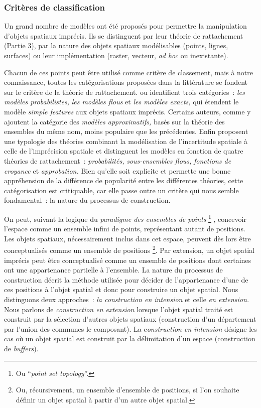 \subsubsection{Critères de classification}

Un grand nombre de modèles ont été proposés pour permettre la
manipulation d’objets spatiaux imprécis. Ils se distinguent par leur
théorie de rattachement (Partie 3), par la nature des objets spatiaux
modélisables (\eg points, lignes, surfaces) ou leur implémentation
(\eg raster, vecteur, \emph{ad hoc} ou inexistante).

Chacun de ces points peut être utilisé comme critère de classement,
mais à notre connaissance, toutes les catégorisations proposées dans
la littérature se fondent sur le critère de la théorie de
rattachement. \textcite{Clementini2008} ou \textcite{Erwig1997}
identifient trois catégories : \emph{les modèles probabilistes,}
\emph{les modèles flous} et \emph{les modèles exacts,} qui étendent le
modèle \emph{simple features} aux objets spatiaux imprécis. Certains
auteurs, comme \textcite{Schneider2001,Schneider2008,Carniel2016} y
ajoutent la catégorie des \emph{modèles approximatifs,} basés sur la
théorie des ensembles du même nom, moins populaire que les
précédentes. Enfin \textcite{Fisher2003,Fisher2005,Fisher2006}
proposent une typologie des théories combinant la modélisation de
l’incertitude spatiale à celle de l’imprécision spatiale et
distinguent les modèles en fonction de quatre théories de
rattachement : \emph{probabilités,} \emph{sous-ensembles flous,}
\emph{fonctions de croyance} et \emph{approbation.} Bien qu’elle soit
explicite et permette une bonne appréhension de la différence de
popularité entre les différentes théories, cette catégorisation est
critiquable, car elle passe outre un critère qui nous semble
fondamental : la nature du processus de construction.

On peut, suivant la logique du \emph{paradigme des ensembles de
  points} \footnote{Ou \foreignquote{english}{\emph{point set
      topology}}.}  \autocite{Egenhofer1990}, concevoir l’espace comme
un ensemble infini de points, représentant autant de positions. Les
objets spatiaux, nécessairement inclus dans cet espace, peuvent dès
lors être conceptualisés comme un ensemble de positions \footnote{Ou,
  récursivement, un ensemble d’ensemble de positions, si l’on souhaite
  définir un objet spatial à partir d’un autre objet spatial.}. Par
extension, un objet spatial imprécis peut être conceptualisé comme un
ensemble de positions dont certaines ont une appartenance partielle à
l’ensemble. La nature du processus de construction décrit la méthode
utilisée pour décider de l’appartenance d’une de ces positions à
l’objet spatial et donc pour construire un objet spatial. Nous
distinguons deux approches : \emph{la construction en intension} et
celle \emph{en extension.} Nous parlons de \emph{construction en
  extension} lorsque l’objet spatial traité est construit par la
sélection d’autres objets spatiaux (\eg construction d’un département
par l’union des communes le composant). La c\emph{onstruction en
  intension} désigne les cas où un objet spatial est construit par la
délimitation d’un espace (\eg construction de \emph{buffers}).

